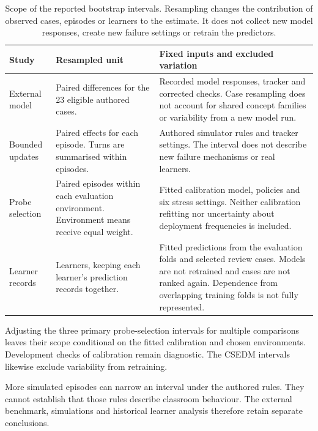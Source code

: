 \begin{table}[htbp]
  \centering
  \caption{Scope of the reported bootstrap intervals. Resampling changes the contribution of observed cases, episodes or
  learners to the estimate. It does not collect new model responses, create new failure settings or retrain the predictors.}
  \label{tab:interval-scope}
  \medskip
  \begin{tabularx}{\textwidth}{@{}>{\raggedright\arraybackslash}p{}>{\raggedright\arraybackslash}X>{\raggedright\arraybackslash}X@{}}
    \toprule
    Study & Resampled unit & Fixed inputs and excluded variation \\
    \midrule
    External model & Paired differences for the 23 eligible authored cases. & Recorded model responses, tracker and corrected checks. Case resampling does not account for shared concept families or variability from a new model run. \\
    \addlinespace
    Bounded updates & Paired effects for each episode. Turns are summarised within episodes. & Authored simulator rules and tracker settings. The interval does not describe new failure mechanisms or real learners. \\
    \addlinespace
    Probe selection & Paired episodes within each evaluation environment. Environment means receive equal weight. & Fitted calibration model, policies and six stress settings. Neither calibration refitting nor uncertainty about deployment frequencies is included. \\
    \addlinespace
    Learner records & Learners, keeping each learner's prediction records together. & Fitted predictions from the evaluation folds and selected review cases. Models are not retrained and cases are not ranked again. Dependence from overlapping training folds is not fully represented. \\
    \bottomrule
  \end{tabularx}
\end{table}

Adjusting the three primary probe-selection intervals for multiple comparisons leaves their scope conditional on the fitted
calibration and chosen environments. Development checks of calibration remain diagnostic. The CSEDM intervals likewise
exclude variability from retraining.

More simulated episodes can narrow an interval under the authored rules. They cannot establish that those rules describe
classroom behaviour. The external benchmark, simulations and historical learner analysis therefore retain separate conclusions.

